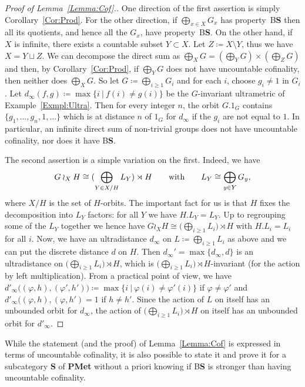 \documentclass[a4paper]{article}
\theoremstyle{definition}
\newcommand*{\category}[1]{\textbf{#1}}
\newcommand*{\PMet}{\category{PMet}}
\newcommand*{\CatS}{\category{S}}
\newcommand*{\BS}{B\textbf{S}}
\newcommand{\setst}[2]{\{#1\ |\ #2\}}
\begin{document}
\begin{proof}[Proof of Lemma~\ref{Lemma:Cof}.]
One direction of the first assertion is simply Corollary~\ref{Cor:Prod}.
For the other direction, if $\bigoplus_{x\in X}G_x$ has property~\BS{} then all its quotients, and hence all the $G_x$, have property~\BS.
On the other hand, if $X$ is infinite, there exists a countable subset $Y \subset X$. Let $Z \coloneqq X\setminus Y$, thus we have $X = Y \sqcup Z$. We can decompose the direct sum as $\bigoplus_XG = (\bigoplus_YG) \times (\bigoplus_ZG)$ and then, by Corollary~\ref{Cor:Prod}, if $\bigoplus_YG$ does not have uncountable cofinality, then neither does $\bigoplus_XG$.
So let $G\coloneqq \bigoplus_{i\geq 1}G_i$ and for each $i$, choose $g_i\neq 1$ in $G_i$.
Let $d_\infty(f,g)\coloneqq\max\setst{i}{f(i)\neq g(i)}$ be the $G$-invariant ultrametric of Example~\ref{Exmpl:Ultra}.
Then for every integer $n$, the orbit $G.1_G$ contains $\{g_1,\dots,g_n,1,\dots\}$ which is at distance $n$ of $1_G$ for $d_\infty$ if the $g_i$ are not equal to $1$.
In particular, an infinite direct sum of non-trivial groups does not have uncountable cofinality, nor does it have \BS.

The second assertion is a simple variation on the first.
Indeed, we have
\[
	G\wr_XH\cong(\bigoplus_{Y\in X/H}L_Y)\rtimes H\qquad\textnormal{with}\qquad L_Y\cong\bigoplus_{y\in Y}G_y,
\]
where $X/H$ is the set of $H$-orbits.
The important fact for us is that $H$ fixes the decomposition into $L_Y$ factors: for all $Y$ we have $H.L_Y=L_Y$.
Up to regrouping some of the $L_Y$ together we hence have $G\wr_XH\cong\bigl(\bigoplus_{i\geq 1}L_i\bigr)\rtimes H$ with $H.L_i=L_i$ for all $i$.
Now, we have an ultradistance $d_\infty$ on $L\coloneqq\bigoplus_{i\geq 1}L_i$ as above and we can put the discrete distance $d$ on $H$.
Then $d_\infty'=\max\{d_\infty,d\}$ is an ultradistance on $\bigl(\bigoplus_{i\geq 1}L_i\bigr)\rtimes H$, which is $\bigl(\bigoplus_{i\geq 1}L_i\bigr)\rtimes H$-invariant (for the action by left multiplication).
From a practical point of view, we have $d'_\infty\bigl((\varphi,h),(\varphi',h')\bigr)\coloneqq\max\setst{i}{\varphi(i)\neq \varphi'(i)}$ if $\varphi\neq \varphi'$ and $d'_\infty\bigl((\varphi,h),(\varphi,h')=1$ if $h\neq h'$.
Since the action of $L$ on itself has an unbounded orbit for $d_\infty$, the action of $\bigl(\bigoplus_{i\geq 1}L_i\bigr)\rtimes H$ on itself has an unbounded orbit for $d'_\infty$.
\end{proof}
%
%
While the statement (and the proof) of Lemma~\ref{Lemma:Cof} is expressed in terms of uncountable cofinality, it is also possible to state it and prove it for a subcategory \CatS{} of \PMet{} without a priori knowing if \BS{} is stronger than having uncountable cofinality.
\end{document}
